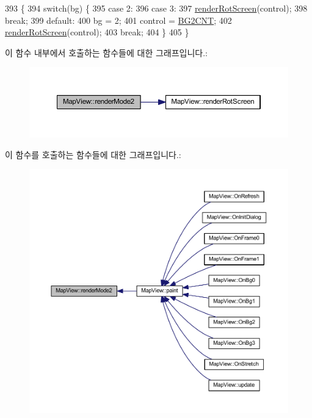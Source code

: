 \begin{DoxyCode}
393 \{
394   \textcolor{keywordflow}{switch}(bg) \{
395   \textcolor{keywordflow}{case} 2:
396   \textcolor{keywordflow}{case} 3:
397     \mbox{\hyperlink{class_map_view_a2e462e6466f052427cd894a7c047fa68}{renderRotScreen}}(control);
398     \textcolor{keywordflow}{break};
399   \textcolor{keywordflow}{default}:
400     bg = 2;
401     control = \mbox{\hyperlink{_globals_8cpp_ad0659703e38445ba2d4959ffe4eb6e5b}{BG2CNT}};
402     \mbox{\hyperlink{class_map_view_a2e462e6466f052427cd894a7c047fa68}{renderRotScreen}}(control);
403     \textcolor{keywordflow}{break};
404   \}  
405 \}
\end{DoxyCode}
이 함수 내부에서 호출하는 함수들에 대한 그래프입니다.\+:
\nopagebreak
\begin{figure}[H]
\begin{center}
\leavevmode
\includegraphics[width=350pt]{class_map_view_a4c9cc923e9b7112cfc15887fdec4284d_cgraph}
\end{center}
\end{figure}
이 함수를 호출하는 함수들에 대한 그래프입니다.\+:
\nopagebreak
\begin{figure}[H]
\begin{center}
\leavevmode
\includegraphics[width=350pt]{class_map_view_a4c9cc923e9b7112cfc15887fdec4284d_icgraph}
\end{center}
\end{figure}
\mbox{\label{class_map_view_a554841422c2e7d39ed988017561276b1}} 

